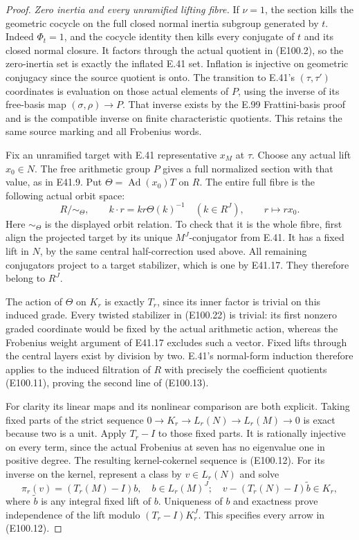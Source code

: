 \begin{proof}
\emph{Zero inertia and every unramified lifting fibre.}
If $\nu=1$, the section kills the
geometric cocycle on the full closed
normal inertia subgroup generated by
$t$. Indeed $\Phi_t=1$, and the
cocycle identity then kills every
conjugate of $t$ and its closed normal
closure. It factors through the actual
quotient in (E100.2), so the zero-inertia
set is exactly the inflated E.41 set.
Inflation is injective on geometric
conjugacy since the source quotient is
onto. The transition to E.41's
$(\tau,\tau')$ coordinates is evaluation
on those actual elements of $P$, using
the inverse of its free-basis map
$(\sigma,\rho)\to P$. That inverse
exists by the E.99 Frattini-basis
proof and is the compatible inverse
on finite characteristic quotients.
This retains the same source marking
and all Frobenius words.

Fix an unramified target with E.41
representative $x_M$ at $\tau$.
Choose any actual lift $x_0\in N$.
The free arithmetic group $P$ gives
a full normalized section with that
value, as in E41.9. Put
$\Theta=\operatorname{Ad}(x_0)T$ on $R$.
The entire full fibre is the following
actual orbit space:
\[
 R/\!\sim_{\Theta},\qquad
 k\cdot r=k r\Theta(k)^{-1}\quad(k\in R^J),
       \qquad r\longmapsto r x_0 .
 \tag{E100.22}
\]
Here $\sim_\Theta$ is the displayed
orbit relation. To check that it
is the whole fibre, first align the
projected target by its unique
$M^J$-conjugator from E.41. It has a
fixed lift in $N$, by the same central
half-correction used above. All
remaining conjugators project to a
target stabilizer, which is one by
E41.17. They therefore belong to $R^J$.

The action of $\Theta$ on $K_r$ is
exactly $T_r$, since its inner factor
is trivial on this induced grade.
Every twisted stabilizer in (E100.22)
is trivial: its first nonzero graded
coordinate would be fixed by the
actual arithmetic action, whereas
the Frobenius weight argument of
E41.17 excludes such a vector.
Fixed lifts through the central
layers exist by division by two.
E.41's normal-form induction therefore
applies to the induced filtration of
$R$ with precisely the coefficient
quotients (E100.11), proving the
second line of (E100.13).

For clarity its linear maps and its
nonlinear comparison are both explicit.
Taking fixed parts of the strict sequence
$0\to K_r\to L_r(N)\to L_r(M)\to0$
is exact because two is a unit.
Apply $T_r-I$ to those fixed parts.
It is rationally injective on every
term, since the actual Frobenius at
seven has no eigenvalue one in
positive degree. The resulting
kernel-cokernel sequence is (E100.12).
For its inverse on the kernel, represent
a class by $v\in L_r(N)$ and solve
\[
 \pi_r(v)=(T_r(M)-I)b,\quad b\in L_r(M)^J;
 \quad v-(T_r(N)-I)\widetilde b\in K_r ,
 \tag{E100.23}
\]
where $\widetilde b$ is any integral
fixed lift of $b$. Uniqueness of $b$
and exactness prove independence of
the lift modulo $(T_r-I)K_r^J$.
This specifies every arrow in (E100.12).


\end{proof}
